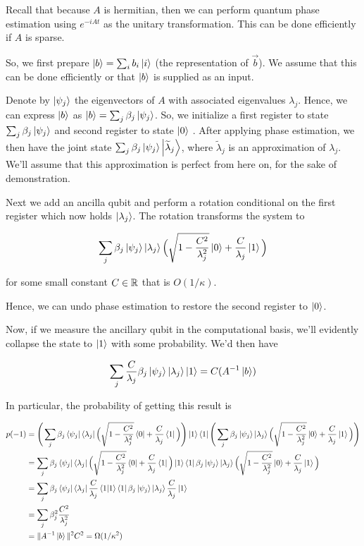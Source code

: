 \documentclass[main.tex]{subfiles}
\begin{document}
Recall that because $A$ is hermitian, then we can perform quantum phase estimation using $e^{-iAt}$ as the unitary transformation. This can be done efficiently if $A$ is sparse.

So, we first prepare $\ket{b} = \sum_i b_i \ket{i}$ (the representation of $\vec{b}$). We assume that this can be done efficiently or that $\ket{b}$ is supplied as an input.

Denote by $\ket{\psi_j}$ the eigenvectors of $A$ with associated eigenvalues $\lambda_j$. Hence, we can express $\ket{b}$ as $\ket{b} = \sum_j \beta_j \ket{\psi_j}$.  So, we initialize a first register to state $\sum_j \beta_j \ket{\psi_j}$ and second register to state $\ket{0}$ . After applying phase estimation, we then have the joint state $\sum_j \beta_j \ket{\psi_j} \ket{\widetilde{\lambda}_j}$, where $\widetilde{\lambda}_j$ is an approximation of $\lambda_j$. We'll assume that this approximation is perfect from here on, for the sake of demonstration. 

Next we add an ancilla qubit and perform a rotation conditional on the first register which now holds $\ket{\lambda_j}$. The rotation transforms the system to

\begin{align*}
\sum_j \beta_j \ket{\psi_j} \ket{\lambda_j} \Big(\sqrt{1-\frac{C^2}{\lambda_j^2}}\ket{0} + \frac{C}{\lambda_j}\ket{1}\Big)
\end{align*}

for some small constant $C \in \mathbb{R}$ that is $O(1/\kappa)$.

Hence, we can undo phase estimation to restore the second register to $\ket{0}$.

Now, if we measure the ancillary qubit in the computational basis, we'll evidently collapse the state to $\ket{1}$ with some probability. We'd then have

\begin{align*}
	\sum_j \frac{C}{\lambda_j} \beta_j \ket{\psi_j} \ket{\lambda_j}\ket{1} = C (A^{-1} \ket{b})
\end{align*}

In particular, the probability of getting this result is 

\begin{align*} 
	p(-1) &= \Bigg(\sum_j \beta_j \bra{\psi_j} \bra{\lambda_j} \Big(\sqrt{1-\frac{C^2}{\lambda_j^2}}\bra{0} + \frac{C}{\lambda_j}\bra{1}\Big) \Bigg)\ket{1}\bra{1} \Bigg(\sum_j \beta_j \ket{\psi_j} \ket{\lambda_j} \Big(\sqrt{1-\frac{C^2}{\lambda_j^2}}\ket{0} + \frac{C}{\lambda_j}\ket{1}\Big)\Bigg) \\
	&= \sum_j \beta_j \bra{\psi_j} \bra{\lambda_j} \Big(\sqrt{1-\frac{C^2}{\lambda_j^2}}\bra{0} + \frac{C}{\lambda_j}\bra{1}\Big) \ket{1}\bra{1} \beta_j \ket{\psi_j} \ket{\lambda_j} \Big(\sqrt{1-\frac{C^2}{\lambda_j^2}}\ket{0} + \frac{C}{\lambda_j}\ket{1}\Big) \\
	&= \sum_j \beta_j \bra{\psi_j} \bra{\lambda_j} \frac{C}{\lambda_j}\bra{1}\ket{1}\bra{1} \beta_j \ket{\psi_j} \ket{\lambda_j} \frac{C}{\lambda_j}\ket{1} \\
	&= \sum_j \beta_j^2 \frac{C^2}{\lambda_j^2} \\
	&= \| A^{-1} \ket{b} \|^2 C^2 = \Omega(1/\kappa^2)
\end{align*} 
\end{document}
